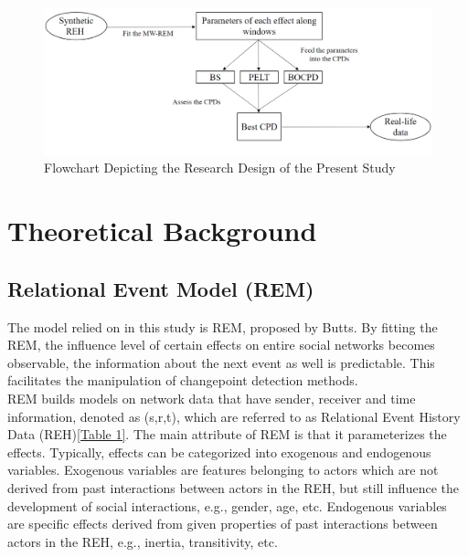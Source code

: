 \documentclass[]{interact}
\theoremstyle{plain}%
\theoremstyle{definition}
\theoremstyle{remark}
\begin{document}
{	\begin{figure}[h]
		\includegraphics[width=14cm]{Flow_whole}
		\centering
		\caption{Flowchart Depicting the Research Design of the Present Study}
		\label{Figure 1}
	\end{figure}
	
	\section{\fontsize{14}{15}\selectfont Theoretical Background}
	
	\subsection{Relational Event Model (REM)}
	
	\hspace{0.2cm} The model relied on in this study is REM, proposed by Butts\cite{buttsRelationalEventFramework2008}. By fitting the REM, the influence level of certain effects on entire social networks becomes observable, the information about the next event as well is predictable. This facilitates the manipulation of changepoint detection methods.\\ 
	
	REM builds models on network data that have sender, receiver and time information, denoted as (s,r,t), which are referred to as Relational Event History Data (REH)\ref{Table 1}. The main attribute of REM is that it parameterizes the effects. Typically, effects can be categorized into exogenous and endogenous variables. Exogenous variables are features belonging to actors which are not derived from past interactions between actors in the REH, but still influence the development of social interactions, e.g., gender, age, etc. Endogenous variables are specific effects derived from given properties of past interactions between actors in the REH, e.g., inertia, transitivity, etc.\\
	
}
\end{document}
